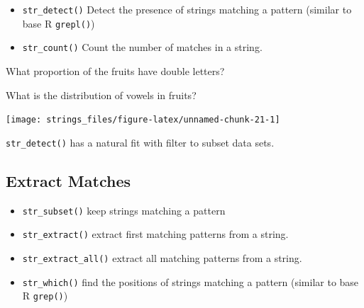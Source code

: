 \documentclass[]{book}
\newenvironment{Shaded}{\begin{snugshade}}{\end{snugshade}}
\newcommand{\KeywordTok}[1]{\textcolor[rgb]{0.13,0.29,0.53}{\textbf{#1}}}
\newcommand{\CharTok}[1]{\textcolor[rgb]{0.31,0.60,0.02}{#1}}
\newcommand{\StringTok}[1]{\textcolor[rgb]{0.31,0.60,0.02}{#1}}
\newcommand{\CommentTok}[1]{\textcolor[rgb]{0.56,0.35,0.01}{\textit{#1}}}
\newcommand{\OperatorTok}[1]{\textcolor[rgb]{0.81,0.36,0.00}{\textbf{#1}}}
\newcommand{\NormalTok}[1]{#1}
\providecommand{\tightlist}{%
  \setlength{\itemsep}{0pt}\setlength{\parskip}{0pt}}
\theoremstyle{definition}
\theoremstyle{definition}
\theoremstyle{definition}
\theoremstyle{remark}
\let\BeginKnitrBlock\begin \let\EndKnitrBlock\end
\begin{document}
\begin{itemize}
\tightlist
\item
  \texttt{str\_detect()} Detect the presence of strings matching a
  pattern (similar to base R \texttt{grepl()})
\item
  \texttt{str\_count()} Count the number of matches in a string.
\end{itemize}

What proportion of the fruits have double letters?

\begin{Shaded}
\end{Shaded}

What is the distribution of vowels in fruits?

\begin{Shaded}
\end{Shaded}

\begin{center}\texttt{[image: strings\_files/figure-latex/unnamed-chunk-21-1]} \end{center}

\BeginKnitrBlock{rmdtip}
\texttt{str\_detect()} has a natural fit with filter to subset data
sets.
\EndKnitrBlock{rmdtip}

\subsection{Extract Matches}\label{extract-matches}

\begin{itemize}
\tightlist
\item
  \texttt{str\_subset()} keep strings matching a pattern
\item
  \texttt{str\_extract()} extract first matching patterns from a string.
\item
  \texttt{str\_extract\_all()} extract all matching patterns from a
  string.
\item
  \texttt{str\_which()} find the positions of strings matching a pattern
  (similar to base R \texttt{grep()})
\end{itemize}
\end{document}
